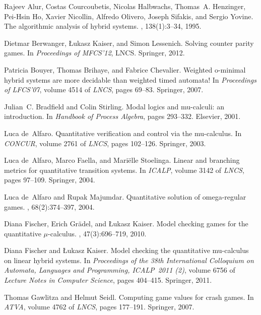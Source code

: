 \documentclass[fleqn,envcountsame]{LMCS}
\begin{document}
\begin{thebibliography}{10}

Rajeev Alur, Costas Courcoubetis, Nicolas Halbwachs, Thomas~A. Henzinger,
  Pei-Hsin Ho, Xavier Nicollin, Alfredo Olivero, Joseph Sifakis, and Sergio
  Yovine.
\newblock The algorithmic analysis of hybrid systems.
, 138(1):3--34, 1995.

Dietmar Berwanger, {\L}ukasz Kaiser, and Simon Lessenich.
\newblock Solving counter parity games.
\newblock In {\em Proceedings of MFCS'12}, LNCS. Springer, 2012.

Patricia Bouyer, Thomas Brihaye, and Fabrice Chevalier.
\newblock Weighted o-minimal hybrid systems are more decidable than weighted
  timed automata!
\newblock In {\em Proceedings of LFCS'07}, volume 4514 of {\em LNCS}, pages
  69--83. Springer, 2007.

Julian~C. Bradfield and Colin Stirling.
\newblock Modal logics and mu-calculi: an introduction.
\newblock In {\em Handbook of Process Algebra}, pages 293--332. Elsevier, 2001.

Luca de~Alfaro.
\newblock Quantitative verification and control via the mu-calculus.
\newblock In {\em CONCUR}, volume 2761 of {\em LNCS}, pages 102--126. Springer,
  2003.

Luca de~Alfaro, Marco Faella, and Mari{\"e}lle Stoelinga.
\newblock Linear and branching metrics for quantitative transition systems.
\newblock In {\em ICALP}, volume 3142 of {\em LNCS}, pages 97--109. Springer,
  2004.

Luca de~Alfaro and Rupak Majumdar.
\newblock Quantitative solution of omega-regular games.
, 68(2):374--397, 2004.

Diana Fischer, Erich Gr{\"a}del, and {\L}ukasz Kaiser.
\newblock Model checking games for the quantitative $\mu$-calculus.
, 47(3):696--719, 2010.

Diana Fischer and {\L}ukasz Kaiser.
\newblock Model checking the quantitative mu-calculus on linear hybrid systems.
\newblock In {\em Proceedings of the 38th International Colloquium on Automata,
  Languages and Programming, ICALP~2011 (2)}, volume 6756 of {\em Lecture Notes
  in Computer Science}, pages 404--415. Springer, 2011.

Thomas Gawlitza and Helmut Seidl.
\newblock Computing game values for crash games.
\newblock In {\em ATVA}, volume 4762 of {\em LNCS}, pages 177--191. Springer,
  2007.


\end{thebibliography}
\end{document}
